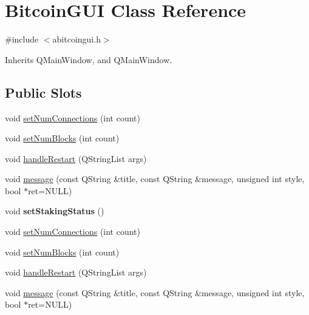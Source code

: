 \hypertarget{class_bitcoin_g_u_i}{}\section{Bitcoin\+G\+UI Class Reference}
\label{class_bitcoin_g_u_i}


{\ttfamily \#include $<$abitcoingui.\+h$>$}



Inherits Q\+Main\+Window, and Q\+Main\+Window.

\subsection*{Public Slots}
\begin{DoxyCompactItemize}
\item 
void \mbox{\hyperlink{class_bitcoin_g_u_i_ae5b9dc62c6a52764a92cfacbe128626f}{set\+Num\+Connections}} (int count)
\item 
void \mbox{\hyperlink{class_bitcoin_g_u_i_ad9c5016f37aa52562c114527a63a2563}{set\+Num\+Blocks}} (int count)
\item 
void \mbox{\hyperlink{class_bitcoin_g_u_i_a0f9d1262e45413fa51a395d41f615917}{handle\+Restart}} (Q\+String\+List args)
\item 
void \mbox{\hyperlink{class_bitcoin_g_u_i_abf1d036341d1fb122398b2b78d2734ea}{message}} (const Q\+String \&title, const Q\+String \&message, unsigned int style, bool $\ast$ret=N\+U\+LL)
\item 
\mbox{\label{class_bitcoin_g_u_i_ae512b4ad46f9cba31be53de5a5c1d398}} 
void {\bfseries set\+Staking\+Status} ()
\item 
void \mbox{\hyperlink{class_bitcoin_g_u_i_ae5b9dc62c6a52764a92cfacbe128626f}{set\+Num\+Connections}} (int count)
\item 
void \mbox{\hyperlink{class_bitcoin_g_u_i_ad9c5016f37aa52562c114527a63a2563}{set\+Num\+Blocks}} (int count)
\item 
void \mbox{\hyperlink{class_bitcoin_g_u_i_a0f9d1262e45413fa51a395d41f615917}{handle\+Restart}} (Q\+String\+List args)
\item 
void \mbox{\hyperlink{class_bitcoin_g_u_i_abf1d036341d1fb122398b2b78d2734ea}{message}} (const Q\+String \&title, const Q\+String \&message, unsigned int style, bool $\ast$ret=N\+U\+LL)
\end{DoxyCompactItemize}
